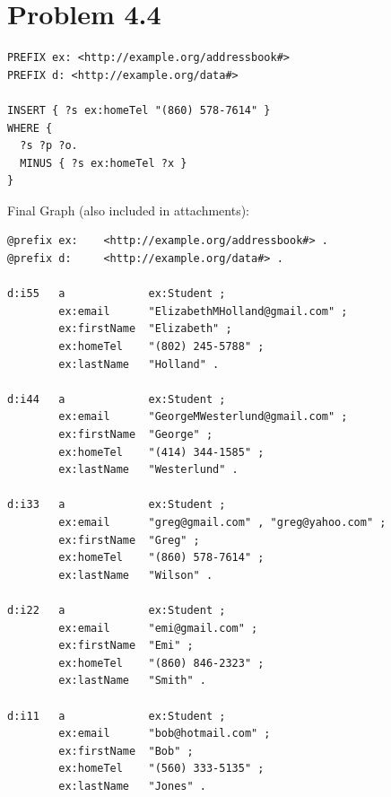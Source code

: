 \documentclass{article}
\newenvironment{problem}[1]{
  \nobreak\section*{Problem #1}
}{}
\begin{document}
  \begin{problem}{4.4}
    \begin{verbatim}
PREFIX ex: <http://example.org/addressbook#>
PREFIX d: <http://example.org/data#>

INSERT { ?s ex:homeTel "(860) 578-7614" }
WHERE { 
  ?s ?p ?o.
  MINUS { ?s ex:homeTel ?x }
}
    \end{verbatim}

    \pagebreak
    Final Graph (also included in attachments):
    \begin{verbatim}
@prefix ex:    <http://example.org/addressbook#> .
@prefix d:     <http://example.org/data#> .

d:i55   a             ex:Student ;
        ex:email      "ElizabethMHolland@gmail.com" ;
        ex:firstName  "Elizabeth" ;
        ex:homeTel    "(802) 245-5788" ;
        ex:lastName   "Holland" .

d:i44   a             ex:Student ;
        ex:email      "GeorgeMWesterlund@gmail.com" ;
        ex:firstName  "George" ;
        ex:homeTel    "(414) 344-1585" ;
        ex:lastName   "Westerlund" .

d:i33   a             ex:Student ;
        ex:email      "greg@gmail.com" , "greg@yahoo.com" ;
        ex:firstName  "Greg" ;
        ex:homeTel    "(860) 578-7614" ;
        ex:lastName   "Wilson" .

d:i22   a             ex:Student ;
        ex:email      "emi@gmail.com" ;
        ex:firstName  "Emi" ;
        ex:homeTel    "(860) 846-2323" ;
        ex:lastName   "Smith" .

d:i11   a             ex:Student ;
        ex:email      "bob@hotmail.com" ;
        ex:firstName  "Bob" ;
        ex:homeTel    "(560) 333-5135" ;
        ex:lastName   "Jones" .

    \end{verbatim}
  \end{problem}
\end{document}
